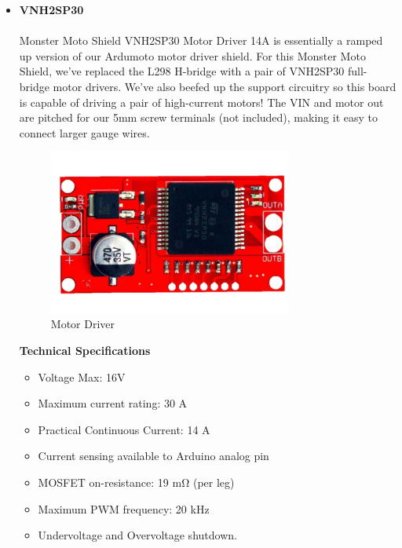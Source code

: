 \begin{itemize}[wide, labelwidth=!, labelindent=0pt]
    \item \textbf{VNH2SP30}
    \vspace{-0.5cm}
    \paragraph{}Monster Moto Shield VNH2SP30 Motor Driver 14A is essentially a ramped up version of our Ardumoto motor driver shield. For this Monster Moto Shield, we’ve replaced the L298 H-bridge with a pair of VNH2SP30 full-bridge motor drivers. We’ve also beefed up the support circuitry so this board is capable of driving a pair of high-current motors! The VIN and motor out are pitched for our 5mm screw terminals (not included), making it easy to connect larger gauge wires.
    
    \begin{figure}[H]
    \centering
    \includegraphics[width = 8cm]{project/images/vnh.jpg}
    \caption{Motor Driver}
    \end{figure}
    
    \begin{center}{\textbf{Technical Specifications}}\end{center}
    
    \begin{itemize}
        \item Voltage Max: 16V
        \item Maximum current rating: 30 A
        \item Practical Continuous Current: 14 A
        \item Current sensing available to Arduino analog pin
        \item MOSFET on-resistance: 19 mΩ (per leg)
        \item Maximum PWM frequency: 20 kHz
        \item Undervoltage and Overvoltage shutdown.
    \end{itemize}

\end{itemize}

